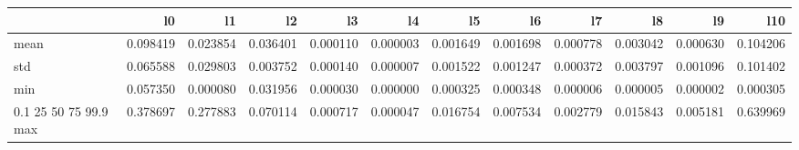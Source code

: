 \begin{tabular}{lrrrrrrrrrrr}
\toprule
 & l0 & l1 & l2 & l3 & l4 & l5 & l6 & l7 & l8 & l9 & l10 \\
\midrule
mean & 0.098419 & 0.023854 & 0.036401 & 0.000110 & 0.000003 & 0.001649 & 0.001698 & 0.000778 & 0.003042 & 0.000630 & 0.104206 \\
std & 0.065588 & 0.029803 & 0.003752 & 0.000140 & 0.000007 & 0.001522 & 0.001247 & 0.000372 & 0.003797 & 0.001096 & 0.101402 \\
min & 0.057350 & 0.000080 & 0.031956 & 0.000030 & 0.000000 & 0.000325 & 0.000348 & 0.000006 & 0.000005 & 0.000002 & 0.000305 \\
0.1%
25%
50%
75%
99.9%
max & 0.378697 & 0.277883 & 0.070114 & 0.000717 & 0.000047 & 0.016754 & 0.007534 & 0.002779 & 0.015843 & 0.005181 & 0.639969 \\
\bottomrule
\end{tabular}

